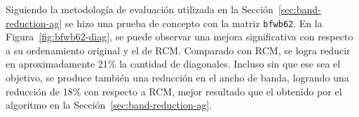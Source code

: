 Siguiendo la metodología de evaluación utilizada en la Sección~\ref{sec:band-reduction-ag} se hizo una prueba de concepto con la matriz \texttt{bfwb62}. En la Figura~\ref{fig:bfwb62-diag}, se puede observar una mejora significativa con respecto a su ordenamiento original y el de RCM. Comparado con RCM, se logra reducir en aproximadamente 21\% la cantidad de diagonales. Incluso sin que ese sea el objetivo, se produce también una reducción en el ancho de banda, logrando una reducción de 18\% con respecto a RCM, mejor resultado que el obtenido por el algoritmo en la Sección~\ref{sec:band-reduction-ag}.



